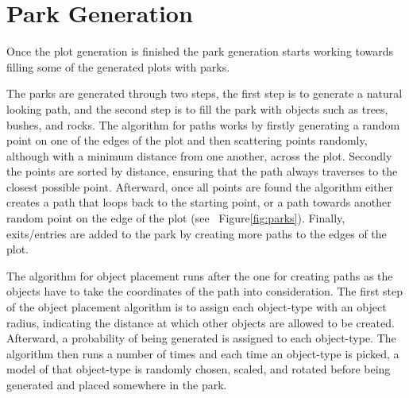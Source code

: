 \section{Park Generation}

Once the plot generation is finished the park generation starts working towards filling some of the generated plots with parks.

The parks are generated through two steps, the first step is to generate a natural looking path, and the second step is to fill the park with objects such as trees, bushes, and rocks. 
The algorithm for paths works by firstly generating a random point on one of the edges of the plot and then scattering points randomly, although with a minimum distance from one another, across the plot. 
Secondly the points are sorted by distance, ensuring that the path always traverses to the closest possible point. 
Afterward, once all points are found the algorithm either creates a path that loops back to the starting point, or a path towards another random point on the edge of the plot (see ~Figure\ref{fig:parks}).
Finally, exits/entries are added to the park by creating more paths to the edges of the plot.  

The algorithm for object placement runs after the one for creating paths as the objects have to take the coordinates of the path into consideration.
The first step of the object placement algorithm is to assign each object-type with an object radius, indicating the distance at which other objects are allowed to be created. 
Afterward, a probability of being generated is assigned to each object-type.
The algorithm then runs a number of times and each time an object-type is picked, a model of that object-type is randomly chosen, scaled, and rotated before being generated and placed somewhere in the park.

